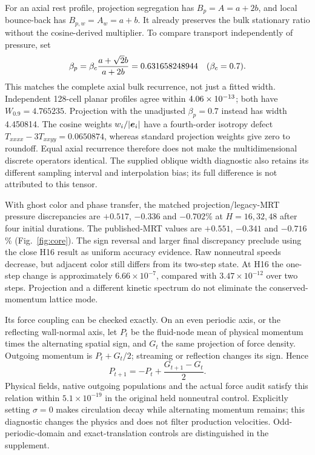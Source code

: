 For an axial rest profile, projection segregation has $B_p=A=a+2b$,
and local bounce-back has $B_{p,w}=A_w=a+b$. It already preserves the
bulk stationary ratio without the cosine-derived multiplier.
To compare transport independently of pressure, set
\begin{equation}
 \beta_p=\beta_c\frac{a+\sqrt{2}b}{a+2b}
             =0.631658248944\quad(\beta_c=0.7).
\end{equation}
This matches the complete axial bulk recurrence, not just a fitted width.
Independent 128-cell planar profiles agree within
$4.06\times10^{-13}$; both have $W_{0.9}=4.765235$.
Projection with the unadjusted $\beta_p=0.7$ instead has width 4.450814.
The cosine weights $w_i/|\bm{e}_i|$ have a fourth-order isotropy defect
$T_{xxxx}-3T_{xxyy}=0.0650874$, whereas standard projection weights
give zero to roundoff. Equal axial recurrence therefore does not make
the multidimensional discrete operators identical. The supplied oblique
width diagnostic also retains its different sampling interval and
interpolation bias; its full difference is not attributed to this tensor.

With ghost color and phase transfer, the matched projection/legacy-MRT
pressure discrepancies are $+0.517$, $-0.336$ and $-0.702$\% at
$H=16,32,48$ after four initial durations. The published-MRT values are
$+0.551$, $-0.341$ and $-0.716$\% (Fig.~\ref{fig:core}).
The sign reversal and larger final discrepancy preclude using the close
H16 result as uniform accuracy evidence. Raw nonneutral speeds decrease,
but adjacent color still differs from its two-step state. At H16 the
one-step change is approximately $6.66\times10^{-7}$, compared with
$3.47\times10^{-12}$ over two steps. Projection and a different kinetic
spectrum do not eliminate the conserved-momentum lattice mode.

Its force coupling can be checked exactly. On an even periodic axis, or
the reflecting wall-normal axis, let $P_t$ be the fluid-node mean of
physical momentum times the alternating spatial sign, and $G_t$ the same
projection of force density. Outgoing momentum is $P_t+G_t/2$; streaming
or reflection changes its sign. Hence
\begin{equation}\label{eq:parityforce}
 P_{t+1}=-P_t+\frac{G_{t+1}-G_t}{2}.
\end{equation}
Physical fields, native outgoing populations and the actual force audit
satisfy this relation within $5.1\times10^{-19}$ in the original held
nonneutral control. Explicitly setting $\sigma=0$ makes circulation
decay while alternating momentum remains; this diagnostic changes the
physics and does not filter production velocities. Odd-periodic-domain
and exact-translation controls are distinguished in the supplement.

